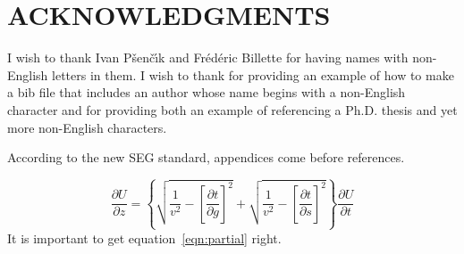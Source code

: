 \documentclass{article}
\begin{document}

\section{ACKNOWLEDGMENTS}

I wish to thank Ivan P\v{s}en\v{c}\'{\i}k and Fr\'ed\'eric Billette
for having names with non-English letters in them.  I wish to thank
\cite{Cerveny} for providing an example of how to make a bib file that
includes an author whose name begins with a non-English character and
\cite{forgues96} for providing both an example of referencing a Ph.D.
thesis and yet more non-English characters.


According to the new SEG standard, appendices come before references.

\begin{equation}
\frac{\partial U}{\partial z} = 
\left\{
  \sqrt{\frac{1}{v^2} - \left[\frac{\partial t}{\partial g}\right]^2} +
  \sqrt{\frac{1}{v^2} - \left[\frac{\partial t}{\partial s}\right]^2}
\right\}
\frac{\partial U}{\partial t}
\label{eqn:partial}
\end{equation}
It is important to get equation~\ref{eqn:partial} right.
\end{document}
